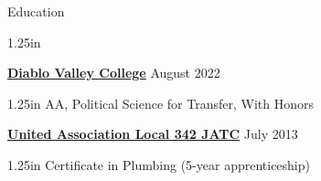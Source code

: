 \documentclass[
	12pt, %
]{resume} %
\newcommand{\righthandindent}{1.25in}
\begin{document}
\begin{rSection}{Education}
\begin{adjustwidth}{20pt}{\righthandindent}
\end{adjustwidth}

    \textbf{\href{https://www.dvc.edu/}{Diablo Valley College}} \hfill August 2022
\begin{adjustwidth}{20pt}{\righthandindent}
    \vspace{-6pt}
    AA, Political Science for Transfer, With Honors
\end{adjustwidth}

    \href{https://ua342.org/training}{\textbf{United Association Local 342 JATC}} \hfill July 2013
\begin{adjustwidth}{20pt}{\righthandindent}
    \vspace{-6pt}
    Certificate in Plumbing (5-year apprenticeship)
\end{adjustwidth}

\end{rSection}
\end{document}
